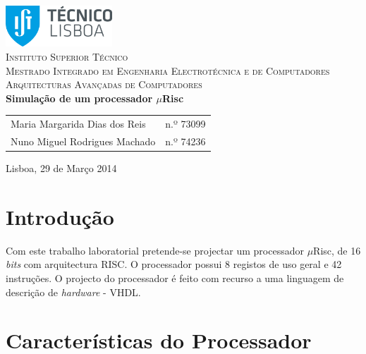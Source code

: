 \documentclass[11pt]{article}
\numberwithin{equation}{section}
\begin{document}
\begin{titlepage}
\begin{center}

\hfill \break
\hfill \break

\includegraphics[width=0.3\textwidth]{./logo}~\\[1cm]

\textsc{\LARGE Instituto Superior Técnico}\\[0.25cm]
\textsc{\Large Mestrado Integrado em Engenharia Electrotécnica e de Computadores}\\[1.8cm]
\textsc{\huge Arquitecturas Avançadas de Computadores}\\[0.25cm]

{\huge \bfseries Simulação de um processador $\mu$Risc\\[1.2cm]}

\begin{tabular}{ l l }
Maria Margarida Dias dos Reis & \hspace{2mm} n.º 73099 \\
Nuno Miguel Rodrigues Machado & \hspace{2mm} n.º 74236 
\end{tabular}

\vfill

{\large Lisboa, 29 de Março 2014} 

\end{center}
\end{titlepage}

\clearpage

\tableofcontents
\pagebreak

\clearpage
{}

\section{Introdução}

Com este trabalho laboratorial pretende-se projectar um processador $\mu$Risc, de 16 \textit{bits} com arquitectura RISC. O processador possui 8 registos de uso geral e 42 instruções. O projecto do processador é feito com recurso a uma linguagem de descrição de \textit{hardware} - VHDL.

\section{Características do Processador}
\end{document}
